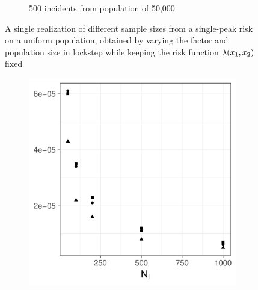 \begin{figure}[htbp]
\begin{subfigure}{0.45\textwidth}
        \caption{500 incidents from population of 50,000}
    \end{subfigure}
    \caption[Examples showing sample size]
        {A single realization of different sample sizes from a single-peak risk on a uniform population, obtained by varying the \gls{factor} and population size in lockstep while keeping the risk function $\lambda (x_1, x_2)$ fixed}
    \label{fig:one_sample:unifNpop_1h}
\end{figure}

\begin{figure}[htbp]
    \centering
    \begin{subfigure}[b]{0.49\textwidth}
        \includegraphics[width=\textwidth]{results/by_pop_size/MISE-vs-population}
        \caption{}
        \label{fig:ise:unifNpop_1h:mise}
    \end{subfigure}
    \begin{subfigure}[b]{0.49\textwidth}

\end{subfigure}
\end{figure}
